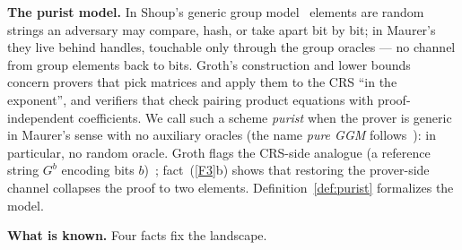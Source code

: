 \documentclass{conjura-conjecture}
\begin{document}
\smallskip
\noindent\textbf{The purist model.}
In Shoup's generic group model~\cite{Sho97} elements are random
strings an adversary may compare, hash, or take apart bit by bit; in
Maurer's~\cite{Mau05} they live behind handles, touchable only
through the group oracles --- no channel from group elements back to
bits.  Groth's construction and lower
bounds~\cite{Gro16} concern provers that pick matrices and apply
them to the CRS ``in the exponent'', and verifiers that check
pairing product equations with proof-independent coefficients.  We
call such a scheme \emph{purist} when the prover is generic in
Maurer's sense with no auxiliary oracles (the name \emph{pure GGM}
follows~\cite{ADY25}): in particular, no random oracle.  Groth flags
the CRS-side analogue (a reference string $G^b$ encoding bits
$b$)~\cite{Gro16}; fact~(\ref{F3}b) shows that restoring the
prover-side channel collapses the proof to two elements.
Definition~\ref{def:purist} formalizes the model.

\smallskip
\noindent\textbf{What is known.}
Four facts fix the landscape.
\end{document}
